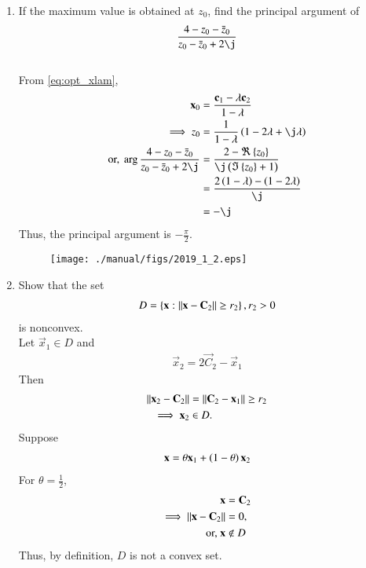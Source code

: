 \documentclass[journal,12pt,twocolumn]{IEEEtran}
\renewcommand\thesection{\arabic{section}}
\begin{document}
\begin{enumerate}[label=\thesection.\arabic*
,ref=\thesection.\theenumi]
\begin{align}
\norm{\frac{\vec{c}_1 -\lambda  \vec{c}_2}{1-\lambda } - \vec{c}_2}^2-r_2^2 &= 0
\\
\implies \lambda = 1\pm \frac{\norm{\vec{c}_1 - \vec{c}_2}}{r_2}&
\\
= 1 \pm \sqrt{\frac{2}{5}}
\end{align}
Fig. \ref{fig:2019_1_2} plots $\Gamma$ for 
\begin{align}
\lambda = 1 - \sqrt{\frac{2}{5}}
\end{align}
\item If the maximum value is obtained at $z_0$, find the principal argument of
\begin{align}
\frac{4 - z_0-\bar{z}_0}{z_0-\bar{z}_0+2\j}
\end{align}
\\
\solution 
From \eqref{eq:opt_xlam},
\begin{align}
 \vec{x}_0  &= \frac{\vec{c}_1 -\lambda  \vec{c}_2}{1-\lambda } 
\\
\implies z_0 &= \frac{1}{1-\lambda}\brak{1-2\lambda + \j \lambda }
\\
\text{or, }\arg \frac{4 - z_0-\bar{z}_0}{z_0-\bar{z}_0+2\j} &= \frac{2 - \Re\cbrak{z_0}}{\j\brak{\Im\cbrak{z_0}+1}}
\\
&=\frac{2\brak{1-\lambda}-\brak{1-2\lambda}}{\j} 
\\
&= -\j
\end{align}
%
Thus, the principal argument is $-\frac{\pi}{2}$.
\begin{figure}[!ht]
\centering
\texttt{[image: ./manual/figs/2019\_1\_2.eps]}
\caption{}
\label{fig:2019_1_2}
\end{figure}

\item Show that the set 
\begin{align}
D = \left\{\mathbf{x}:\left\Vert\mathbf{x}-\mathbf{C}_2\right\Vert \ge r_2\right\}, r_2 > 0
\end{align}
%
is nonconvex.
\\
\solution Let $\vec{x}_1 \in D$ and 
\begin{align}
\vec{x}_2 = 2\vec{C}_2-\vec{x}_1
\end{align}
Then 
\begin{align}
\left\Vert\mathbf{x}_2-\mathbf{C}_2\right\Vert &= \left\Vert\mathbf{C}_2-\mathbf{x}_1\right\Vert \ge r_2
\\
\implies \mathbf{x}_2 &\in D.
\end{align}
Suppose 
\begin{align}
\mathbf{x} = \theta\mathbf{x}_1+\left(1-\theta\right)\mathbf{x}_2
\end{align}
For $\theta = \frac{1}{2}$,
\begin{align}
\mathbf{x} &= \mathbf{C}_2
\\
\implies \left\Vert\mathbf{x}-\mathbf{C}_2\right\Vert &= 0,
\\
\text{or, } \mathbf{x} &\notin D
\end{align}
Thus, by definition, $D$ is not a convex set.
\end{enumerate}

\end{document}
